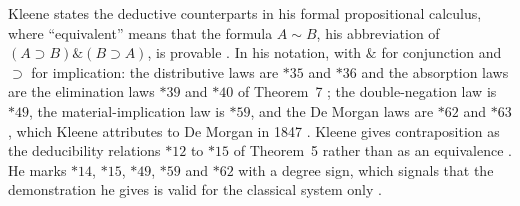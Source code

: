 Kleene states the deductive counterparts in his formal propositional
calculus, where ``equivalent'' means that the formula \(A\sim B\), his
abbreviation of \((A\supset B)\mathbin{\&}(B\supset A)\), is provable
\cite[\S 26, p.~113]{Kleene1952}.  In his notation, with \(\&\) for
conjunction and \(\supset\) for implication: the distributive laws are
\({*}35\) and \({*}36\) and the absorption laws are the elimination laws
\({*}39\) and \({*}40\) of Theorem~7
\cite[\S 27, p.~118]{Kleene1952}; the double-negation law is \({*}49\), the
material-implication law is \({*}59\), and the De Morgan laws are
\({*}62\) and \({*}63\), which Kleene attributes to De Morgan in 1847
\cite[\S 27, p.~119]{Kleene1952}.  Kleene gives contraposition as the
deducibility relations \({*}12\) to \({*}15\) of Theorem~5 rather than as an
equivalence \cite[\S 26, p.~113]{Kleene1952}.  He marks \({*}14\), \({*}15\),
\({*}49\), \({*}59\) and \({*}62\) with a degree sign, which signals that the
demonstration he gives is valid for the classical system only
\cite[\S 23, p.~101]{Kleene1952}.
